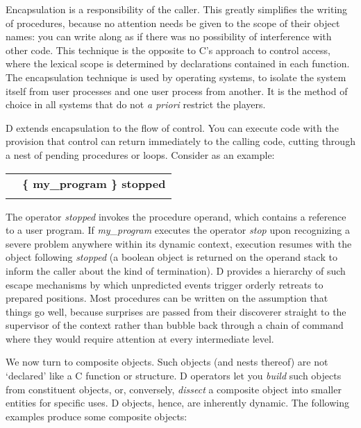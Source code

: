 Encapsulation is a responsibility of the caller. This greatly simplifies the  writing of procedures,  because no attention needs be given  to  the scope  of  their object names:  you can write along as if  there  was  no possibility  of  interference  with other code.  This  technique  is  the opposite  to C's approach to control access,  where the lexical scope  is determined by declarations contained in each function.  The encapsulation technique is used by operating systems, to isolate the system itself from user  processes and one user process from another.  It is the  method  of choice in all systems that do not \emph{a priori} restrict the players.

D  extends encapsulation to the flow of control.  You can  execute  code with  the  provision that control can return immediately to  the  calling code,  cutting through a nest of pending procedures or loops. Consider as an example:\\

\begin{tabular}{>{\normalfont}l>{\sffamily\bfseries}l}
 & \{ my\_program \} stopped \\\\
\end{tabular}

\noindent The operator \emph{stopped} invokes the procedure operand,  which  contains  a reference  to a user program.  If \emph{my\_program} executes the operator \emph{stop}  upon  recognizing a severe problem anywhere within its  dynamic  context, execution resumes with the object following \emph{stopped} (a boolean object  is returned  on  the operand stack to inform the caller about  the  kind  of termination).  D provides a hierarchy of such escape mechanisms by  which unpredicted events trigger orderly retreats to prepared  positions.  Most procedures can be written on the assumption that things go well,  because surprises are passed from their discoverer straight to the supervisor  of the  context  rather than bubble back through a chain  of  command where they would require attention at every intermediate level.

We now turn to composite objects.  Such objects (and nests thereof)  are not  `declared' like a C function or structure.  D operators let you \emph{build} such  objects  from  constituent  objects,   or,  conversely,  \emph{dissect}  a composite  object  into smaller entities for specific  uses.  D  objects, hence, are inherently dynamic. The following examples produce some composite objects:\\

